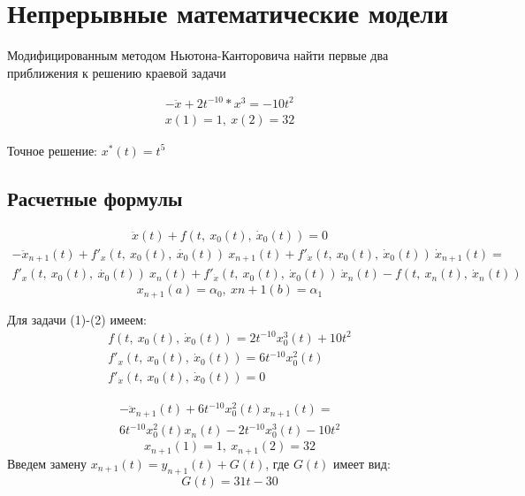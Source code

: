 \documentclass[12pt]{article}
\begin{document}
\section*{Непрерывные математические модели}

Модифицированным методом Ньютона-Канторовича найти первые два приближения к решению краевой задачи

\begin{gather}
	-\ddot{x} + 2t^{-10}*x^3 = -10t^2 \\
	x(1)=1,\ x(2)=32
\end{gather}

Точное решение: $x^*(t) = t^5$

\subsection*{Расчетные формулы}



\begin{gather}
\ddot{x}(t) + f(t,\ x_0(t),\ \dot{x}_0(t)) = 0
\end{gather}
\begin{multline}
	-\ddot{x}_{n+1}(t) + f'_x(t,\ x_0(t),\ \dot{x_0}(t))\ x_{n+1}(t) +
	f'_{\dot{x}}(t,\ x_0(t),\ \dot{x}_0(t))\ \dot{x}_{n+1}(t) = \\
	f'_x(t,\ x_0(t),\ \dot{x_0}(t))\ x_n(t) +
	f'_{\dot{x}}(t,\ x_0(t),\ \dot{x}_0(t))\ \dot{x}_n(t) -
	f(t,\ x_n(t),\ \dot{x}_n(t))
\end{multline}
\begin{equation}
	x_{n+1}(a) = \alpha_0,\ x{n+1}(b) = \alpha_1
\end{equation}

Для задачи (1)-(2) имеем:
\begin{gather*}
	f(t,\ x_0(t),\ \dot{x}_0(t)) = 2t^{-10}x^3_0(t) + 10t^2 \\
	f'_x(t,\ x_0(t),\ \dot{x}_0(t)) = 6t^{-10}x^2_0(t) \\
	f'_{\dot{x}}(t,\ x_0(t),\ \dot{x}_0(t)) = 0
\end{gather*}

\begin{multline}
-\ddot{x}_{n+1}(t) + 6t^{-10}x^2_0(t)x_{n+1}(t) = \\
 6t^{-10}x^2_0(t)x_n(t) - 2t^{-10}x^3_0(t) - 10t^2
\end{multline}
\begin{equation}
x_{n+1}(1)=1,\ x_{n+1}(2)=32
\end{equation}
Введем замену $x_{n+1}(t) = y_{n+1}(t) + G(t)$, где $G(t)$ имеет вид:
\begin{equation}
G(t) = 31t - 30
\end{equation}
\end{document}
